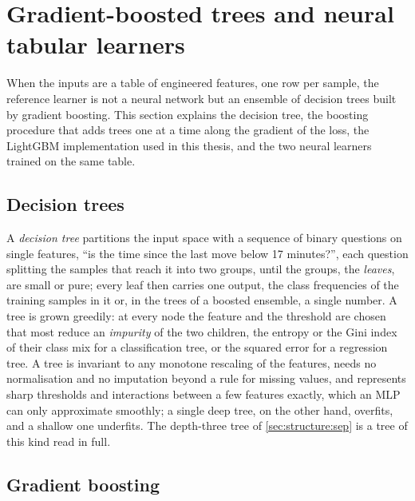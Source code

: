 \section{Gradient-boosted trees and neural tabular learners}
\label{sec:bg:tabular}

When the inputs are a table of engineered features, one row per sample, the reference
learner is not a neural network but an ensemble of decision trees built by gradient
boosting.  This section explains the decision tree, the boosting procedure that adds trees
one at a time along the gradient of the loss, the LightGBM implementation
\cite{ke2017lightgbm} used in this thesis, and
the two neural learners trained on the same table.

\subsection{Decision trees}

A \emph{decision tree} \cite{breiman1984cart} partitions the input space with a sequence
of binary questions on single features, ``is the time since the last move below 17
minutes?'', each question splitting the samples that reach it into two groups, until the
groups, the \emph{leaves}, are small or pure; every leaf then carries one output, the
class frequencies of the training samples in it or, in the trees of a boosted ensemble, a
single number.  A tree is grown greedily: at every node the feature and the threshold are
chosen that most reduce an \emph{impurity} of the two children, the entropy or the Gini
index of their class mix for a classification tree, or the squared error for a regression
tree.  A tree is invariant to any monotone rescaling of the features, needs no
normalisation and no imputation beyond a rule for missing values, and represents sharp
thresholds and interactions between a few features exactly, which an MLP can only
approximate smoothly; a single deep tree, on the other hand, overfits, and a shallow one
underfits.  The depth-three tree of \cref{sec:structure:sep} is a tree of this kind read
in full.

\subsection{Gradient boosting}
\label{sec:bg:boosting}

